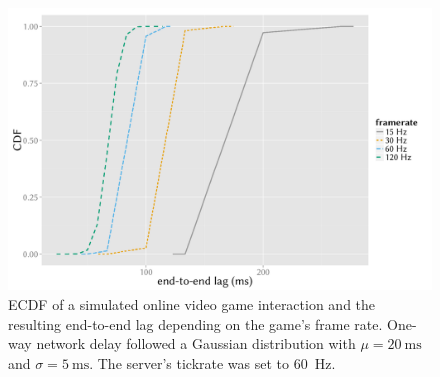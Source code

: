 

\begin{figure}[!t]
	\centering
	\includegraphics[width=1.0\columnwidth]{images/R-gamesim.pdf}
	\caption{\acrshort{ECDF} of a simulated online video game interaction 
and the resulting end-to-end lag depending on the game's frame rate. 
One-way network delay followed a Gaussian distribution with $\mu = 
\SI{20}{\milli\second}$ and $\sigma = \SI{5}{\milli\second}$. The 
server's tickrate was set to \SI{60}{\hertz}.}
\label{fig:e2e-delay-sim}
\end{figure}








